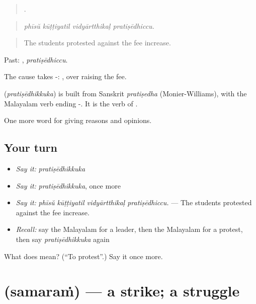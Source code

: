 \begin{quote}
   .
\end{quote}

\begin{quote}
\emph{phīsŭ kūṭṭiyatil vidyārtthikaḷ pratiṣēdhiccu.}
\end{quote}

\begin{quote}
The students protested against the fee increase.
\end{quote}

Past: , \emph{pratiṣēdhiccu}.

The cause takes -:  , over raising the fee.

\begin{cousinweb}
\textbf{} (\emph{pratiṣēdhikkuka}) is built from Sanskrit \emph{pratiṣedha} (Monier-Williams), with the Malayalam verb ending -. It is the verb of .
\end{cousinweb}

\begin{grammarlens}[title={What you've built}]
One more word for giving reasons and opinions.
\end{grammarlens}

\subsection*{Your turn}
\begin{itemize}
\raggedright
  \item \emph{Say it:} \emph{pratiṣēdhikkuka}
  \item \emph{Say it:} \emph{pratiṣēdhikkuka}, once more
  \item \emph{Say it:} \emph{phīsŭ kūṭṭiyatil vidyārtthikaḷ pratiṣēdhiccu.} — The students protested against the fee increase.
  \item \emph{Recall:} say the Malayalam for a leader, then the Malayalam for a protest, then say \emph{pratiṣēdhikkuka} again
\end{itemize}

\begin{tcolorbox}[breakable,colback=teal!4,colframe=teal!35!black,title={Before you move on}]
What does  mean? (\textquotedblleft{}To protest\textquotedblright{}.) Say it once more.
\end{tcolorbox}
\section[\texorpdfstring{\ml{സമരം} (samaraṁ)}{സമരം (samaraṁ)}]{ (samaraṁ) — a strike; a struggle}

